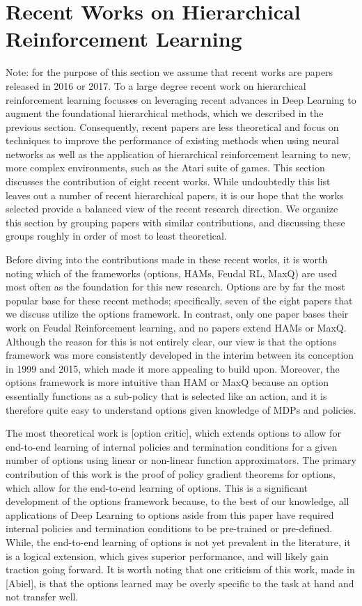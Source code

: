 \section{Recent Works on Hierarchical Reinforcement Learning}
Note: for the purpose of this section we assume that recent works are papers released in 2016 or 2017.
To a large degree recent work on hierarchical reinforcement learning focusses on leveraging recent advances in
Deep Learning to augment the foundational hierarchical methods, which we described in the previous section.
Consequently, recent papers are less theoretical and focus on techniques to improve the performance
of existing methods when using neural networks as well as the application of hierarchical reinforcement learning
to new, more complex environments, such as the Atari suite of games.
This section discusses the contribution of eight recent works. While undoubtedly this list leaves out a number
of recent hierarchical papers, it is our hope that the works selected provide a balanced view of the recent
research direction. We organize this section by grouping papers with similar contributions, and discussing
these groups roughly in order of most to least theoretical.

Before diving into the contributions made in these recent works, it is worth noting which of the frameworks
(options, HAMs, Feudal RL, MaxQ) are used most often as the foundation for this new research.
Options are by far the most popular base for these recent methods; specifically, seven of the eight
papers that we discuss utilize the options framework. In contrast, only one paper bases their work
on Feudal Reinforcement learning, and no papers extend HAMs or MaxQ. Although the reason for this is
not entirely clear, our view is that the options framework was more consistently developed in the interim
between its conception in 1999 and 2015, which made it more appealing to build upon. Moreover, the options
framework is more intuitive than HAM or MaxQ because an option essentially functions as a sub-policy that is
selected like an action, and it is therefore quite easy to understand options given knowledge of MDPs and policies.

The most theoretical work is [option critic], which extends options to allow for end-to-end learning
of internal policies and termination conditions for a given number of options using
linear or non-linear function approximators. The primary contribution of this work is the proof
of policy gradient theorems for options, which allow for the end-to-end learning of options.
This is a significant development of the options framework because, to the best of our knowledge,
all applications of Deep Learning to options aside from this paper have required internal policies
and termination conditions to be pre-trained or pre-defined. While, the end-to-end learning of options
is not yet prevalent in the literature, it is a logical extension, which gives superior performance, and
will likely gain traction going forward. It is worth noting that one criticism of this work,
made in [Abiel], is that the options learned may be overly specific to the task at hand and not transfer well.

